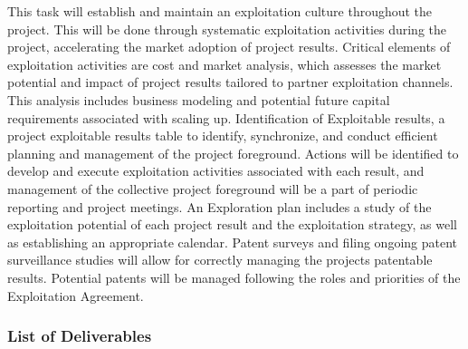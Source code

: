 \begin{planactivitybody}
This task will establish and maintain an exploitation culture throughout
the project. This will be done through systematic exploitation
activities during the project, accelerating the market adoption of
project results. Critical elements of exploitation activities are cost
and market analysis, which assesses the market potential and impact of
project results tailored to partner exploitation channels. This analysis
includes business modeling and potential future capital requirements
associated with scaling up. Identification of Exploitable results, a
project exploitable results table to identify, synchronize, and conduct
efficient planning and management of the project foreground. Actions
will be identified to develop and execute exploitation activities
associated with each result, and management of the collective project
foreground will be a part of periodic reporting and project meetings. An
Exploration plan includes a study of the exploitation potential of each
project result and the exploitation strategy, as well as establishing an
appropriate calendar. Patent surveys and filing ongoing patent
surveillance studies will allow for correctly managing the
project\textquotesingle s patentable results. Potential patents will be
managed following the roles and priorities of the Exploitation
Agreement.
\end{planactivitybody}

\subsubsection{\texorpdfstring{List of Deliverables
}{List of Deliverables }}\label{list-of-deliverables}

